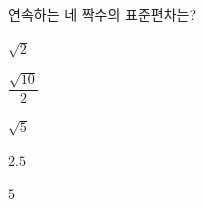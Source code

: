 연속하는 네 짝수의 표준편차는?
\begin{choices32}{\rule[-3ex]{0pt}{8ex}$\sqrt{2}$}{\rule[-3ex]{0pt}{8ex}$\dfrac{\sqrt{10}}{2}$}{\rule[-3ex]{0pt}{8ex}$\sqrt{5}$}{\rule[-3ex]{0pt}{8ex}$2.5$}{\rule[-3ex]{0pt}{8ex}$5$}\end{choices32}

